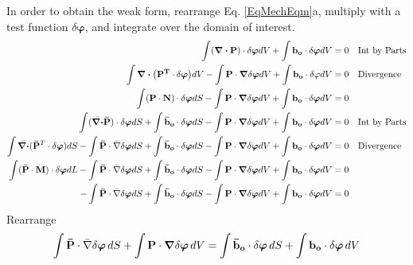 \documentclass[12pt,3p]{article}
\numberwithin{equation}{section}
\begin{document}
In order to obtain the weak form, rearrange Eq. \ref{EqMechEqm}a, multiply with a test function $\delta \boldsymbol\varphi$, and integrate over the domain of interest.
\begin{align*}
\int (\div \mathbf{P}) \cdot \delta \boldsymbol\varphi dV + \int \mathbf{b_o} \cdot \delta \boldsymbol\varphi dV &= 0 \quad \text{Int by Parts} \\
\int \div (\mathbf{P^T} \cdot \delta \boldsymbol\varphi) dV - \int \mathbf{P} \cdot \grad \delta \boldsymbol\varphi dV+ \int \mathbf{b_o} \cdot \delta \varphi dV &= 0 \quad \text{Divergence} \\
\int (\mathbf{P} \cdot \mathbf{N}) \cdot \delta \boldsymbol\varphi dS - \int \mathbf{P} \cdot \grad \delta \boldsymbol\varphi dV+ \int \mathbf{b_o} \cdot \delta \boldsymbol\varphi dV &= 0 \quad \\
\int (\bar{\div} \mathbf{\bar{P}}) \cdot \delta \boldsymbol\varphi dS + \int \mathbf{\bar{b}_o} \cdot \delta \boldsymbol\varphi dS - \int \mathbf{P} \cdot \grad \delta \boldsymbol\varphi dV+ \int \mathbf{b_o} \cdot \delta \boldsymbol\varphi dV &= 0 \quad \text{Int by Parts}\\
\int \bar{\div} (\mathbf{\bar{P}}^T \cdot \delta \boldsymbol\varphi) dS - \int \mathbf{\bar{P}} \cdot \bar{\nabla} \delta \boldsymbol\varphi dS + \int \mathbf{\bar{b}_o} \cdot \delta \boldsymbol\varphi dS - \int \mathbf{P} \cdot \grad \delta \boldsymbol\varphi dV+ \int \mathbf{b_o} \cdot \delta \boldsymbol\varphi dV &= 0 \quad \text{Divergence} \\
\int (\mathbf{\bar{P}} \cdot \mathbf{M}) \cdot \delta \boldsymbol\varphi dL - \int \mathbf{\bar{P}} \cdot \bar{\nabla} \delta \boldsymbol\varphi dS + \int \mathbf{\bar{b}_o} \cdot \delta \boldsymbol\varphi dS - \int \mathbf{P} \cdot \grad \delta \boldsymbol\varphi dV+ \int \mathbf{b_o} \cdot \delta \boldsymbol\varphi dV &= 0 \\
- \int \mathbf{\bar{P}} \cdot \bar{\nabla} \delta \boldsymbol\varphi dS + \int \mathbf{\bar{b}_o} \cdot \delta \boldsymbol\varphi dS - \int \mathbf{P} \cdot \grad \delta \boldsymbol\varphi dV+ \int \mathbf{b_o} \cdot \delta \boldsymbol\varphi dV &= 0 
\end{align*}
Rearrange 
\begin{equation}\label{EqMechWeakForm}
\int \mathbf{\bar{P}} \cdot \bar{\nabla} \delta \boldsymbol\varphi \, dS 
+ \int \mathbf{P} \cdot \grad \delta \boldsymbol\varphi \,dV 
= \int \mathbf{\bar{b}_o} \cdot \delta \boldsymbol\varphi \,dS 
+ \int \mathbf{b_o} \cdot \delta \boldsymbol\varphi \, dV
\end{equation}
\end{document}
